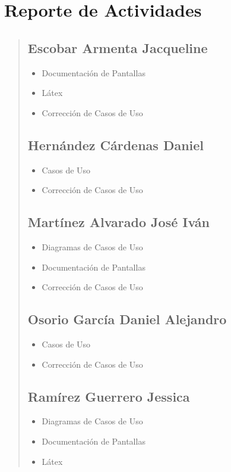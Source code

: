 \documentclass[14pt]{article}
\begin{document}
    \section{Reporte de Actividades}
        \begin{quote}
        \subsection{Escobar Armenta Jacqueline}
            \begin{itemize}
                \item Documentación de Pantallas
                \item Látex
                \item Corrección de Casos de Uso
            \end{itemize}
        \subsection{Hernández Cárdenas Daniel}
            \begin{itemize}
                \item Casos de Uso
                \item Corrección de Casos de Uso
            \end{itemize}
        \subsection{Martínez Alvarado José Iván}
            \begin{itemize}
                \item Diagramas de Casos de Uso
                \item Documentación de Pantallas
                \item Corrección de Casos de Uso
            \end{itemize}
        \subsection{Osorio García Daniel Alejandro}
            \begin{itemize}
                \item Casos de Uso
                \item Corrección de Casos de Uso
            \end{itemize}
        \subsection{Ramírez Guerrero Jessica}
            \begin{itemize}
                \item Diagramas de Casos de Uso
                \item Documentación de Pantallas
                \item Látex
            \end{itemize}

\end{quote}
\end{document}
